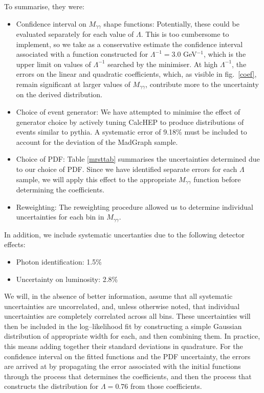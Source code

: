 To summarise, they were:
\begin{itemize}
\item Confidence interval on $M_{\gamma\gamma}$ shape functions: Potentially, these could be evaluated separately for each value of $\Lambda$. This is too cumbersome to implement, so we take as a conservative estimate the confidence interval associated with a function constructed for $\Lambda^{-1}=3.0$ GeV$^{-1}$, which is the upper limit on values of $\Lambda^{-1}$ searched by the minimiser. At high $\Lambda^{-1}$, the errors on the linear and quadratic coefficients, which, as visible in fig.~\ref{coef}, remain significant at larger values of $M_{\gamma\gamma}$, contribute more to the uncertainty on the derived distribution.
\item Choice of event generator: We have attempted to minimise the effect of generator choice by actively tuning CalcHEP to produce distributions of events similar to pythia. A systematic error of 9.18\% must be included to account for the deviation of the MadGraph sample.
\item Choice of PDF: Table \ref{mrsttab} summarises the uncertainties determined due to our choice of PDF. Since we have identified separate errors for each $\Lambda$ sample, we will apply this effect to the appropriate $M_{\gamma\gamma}$ function before determining the coefficients.
\item Reweighting: The reweighting procedure allowed us to determine individual uncertainties for each bin in $M_{\gamma\gamma}$.
\end{itemize}
In addition, we include systematic uncertanties due to the following detector effects:
\begin{itemize}
\item Photon identification: 1.5\%
\item Uncertainty on luminosity: 2.8\%
\end{itemize}

We will, in the absence of better information, assume that all systematic uncertainties are uncorrelated, and, unless otherwise noted, that individual uncertainties are completely correlated across all bins. These uncertainties will then be included in the log--likelihood fit by constructing a simple Gaussian distribution of appropriate width for each, and then combining them. In practice, this means adding together their standard deviations in quadrature. For the confidence interval on the fitted functions and the PDF uncertainty, the errors are arrived at by propagating the error associated with the initial functions through the process that determines the coefficients, and then the process that constructs the distribution for $\Lambda=0.76$ from those coefficients.

